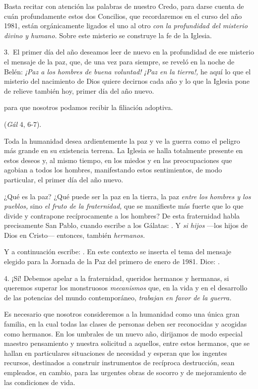 Basta recitar con atención las palabras de nuestro Credo, para darse cuenta de cuán profundamente estos dos Concilios, que recordaremos en el curso del año 1981, están orgánicamente ligados el uno al otro \emph{con la profundidad del misterio divino y humano.} Sobre este misterio se construye la fe de la Iglesia.

3.~El primer día del año deseamos leer de nuevo en la profundidad de ese misterio el mensaje de la paz, que, de una vez para siempre, se reveló en la noche de Belén: \emph{¡Paz a los hombres de buena voluntad! ¡Paz en la tierra!,} he aquí lo que el misterio del nacimiento de Dios quiere decirnos cada año y lo que la Iglesia pone de relieve también hoy, primer día del año nuevo.

 para que nosotros podamos recibir la filiación adoptiva.

 (\emph{Gál} 4, 6-7).

Toda la humanidad desea ardientemente la paz y ve la guerra como el peligro más grande en su existencia terrena. La Iglesia se halla totalmente presente en estos deseos y, al mismo tiempo, en los miedos y en las preocupaciones que agobian a todos los hombres, manifestando estos sentimientos, de modo particular, el primer día del año nuevo.

¿Qué es la paz? ¿Qué puede ser la paz en la tierra, la paz \emph{entre los hombres y los pueblos,} sino \emph{el fruto de la fraternidad,} que se manifieste más fuerte que lo que divide y contrapone recíprocamente a los hombres? De esta fraternidad habla precisamente San Pablo, cuando escribe a los Gálatas: . Y \emph{si hijos} ---los hijos de Dios en Cristo--- entonces, también \emph{hermanos.}

Y a continuación escribe: . En este contexto se inserta el tema del mensaje elegido para la Jornada de la Paz del primero de enero de 1981. Dice: \emph{}.

4. ¡Sí! Debemos apelar a la fraternidad, queridos hermanos y hermanas, si queremos superar los monstruosos \emph{mecanismos} que, en la vida y en el desarrollo de las potencias del mundo contemporáneo, \emph{trabajan en favor de la guerra.}

Es necesario que nosotros consideremos a la humanidad como una única gran familia, en la cual todas las clases de personas deben ser reconocidas y acogidas como hermanos. En los umbrales de un nuevo año, dirijamos de modo especial maestro pensamiento y nuestra solicitud a aquellos, entre estos hermanos, que se hallan en particulares situaciones de necesidad y esperan que los ingentes recursos, destinados a construir instrumentos de recíproca destrucción, sean empleados, en cambio, para las urgentes obras de socorro y de mejoramiento de las condiciones de vida.

